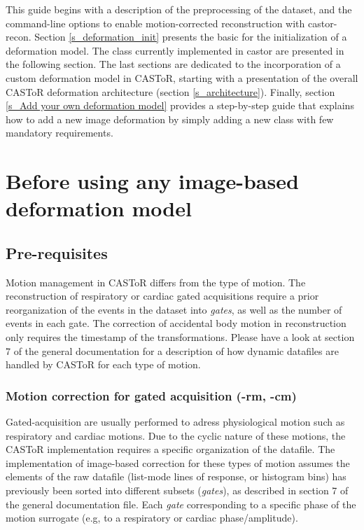 \documentclass[a4paper, 11pt]{article}
\begin{document}
This guide begins with a description of the preprocessing of the dataset, and the command-line options to enable motion-corrected reconstruction with castor-recon. Section \ref{s_deformation_init} presents the basic for the initialization of a deformation model. The class currently implemented in castor are presented in the following section. The last sections are dedicated to the incorporation of a custom deformation model in CASToR, starting with a presentation of the overall CASToR deformation architecture (section \ref{s_architecture}). Finally, section \ref{s_Add your own deformation model} provides a step-by-step guide that explains how to add a new image deformation by simply adding a new class with few mandatory requirements.
\color{black}

\clearpage
\section{Before using any image-based deformation model}
\label{s_prerequisites}

\subsection{Pre-requisites}

Motion management in CASToR differs from the type of motion. The reconstruction of respiratory or cardiac gated acquisitions require a prior reorganization of the events in the dataset into \textit{gates}, as well as the number of events in each gate. The correction of accidental body motion in reconstruction only requires the timestamp of the transformations. Please have a look at section 7 of the general documentation for a description of how dynamic datafiles are handled by CASToR for each type of motion.


\subsubsection{Motion correction for gated acquisition (-rm, -cm)}

Gated-acquisition are usually performed to adress physiological motion such as respiratory and cardiac motions. Due to the cyclic nature of these motions, the CASToR implementation requires a specific organization of the datafile. The implementation of image-based correction for these types of motion assumes the elements of the raw datafile (list-mode lines of response, or histogram bins) has previously been sorted into different subsets (\textit{gates}), as described in section 7 of the general documentation file. Each \textit{gate} corresponding to a specific phase of the motion surrogate (e.g, to a respiratory or cardiac phase/amplitude).
\end{document}
